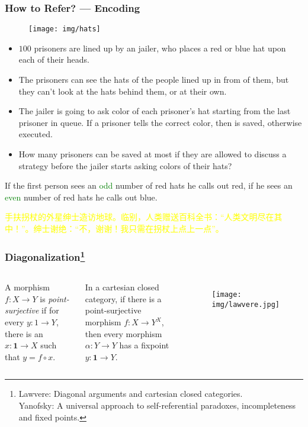 \documentclass[UTF8,11pt,colorlinks,compress,openany]{beamer}%
\begin{document}
\begin{frame}\frametitle{How to Refer? --- Encoding}
	\begin{figure}
		\centering \texttt{[image: img/hats]}
	\end{figure}
	\begin{itemize}
		\item $100$ prisoners are lined up by an jailer, who places a red or blue hat upon each of their heads.
		\item The prisoners can see the hats of the people lined up in from of them, but they can't look at the hats behind them, or at their own.
		\item The jailer is going to ask color of each prisoner's hat starting from the last prisoner in queue. If a prisoner tells the correct color, then is saved, otherwise executed.
		\item How many prisoners can be saved at most if they are allowed to discuss a strategy before the jailer starts asking colors of their hats?
	\end{itemize}
	\begin{block}{}
		If the first person sees an \textcolor{green}{odd} number of red hats he calls out red, if he sees an \textcolor{green}{even} number of red hats he calls out blue.
	\end{block}
\begin{block}{}
\small \textcolor{yellow}{手扶拐杖的外星绅士造访地球。临别，人类赠送百科全书：“人类文明尽在其中！”。绅士谢绝：“不，谢谢！我只需在拐杖上点上一点”。}
\end{block}
\end{frame}

\begin{frame}\frametitle{Diagonalization\footnote{\tiny Lawvere: Diagonal arguments and cartesian closed categories.\\
Yanofsky: A universal approach to self-referential paradoxes, incompleteness and fixed points.}}
\setlength\abovedisplayskip{0pt}
\setlength\belowdisplayskip{0pt}
\begin{columns}
\begin{definition}
A morphism $f: X\to Y$ is \emph{point-surjective} if for every $y: 1\to Y$, there is an $x: \mathbf{1}\to X$ such that $y=f\circ x$.
\end{definition}
	\begin{theorem}
		In a cartesian closed category, if there is a point-surjective morphism $f: X\to Y^X$, then every morphism $\alpha: Y\to Y$ has a fixpoint $y:\mathbf{1}\to Y$.
	\end{theorem}
	\begin{figure}
		\texttt{[image: img/lawvere.jpg]}
	\end{figure}
\end{columns}
\end{frame}
\end{document}

